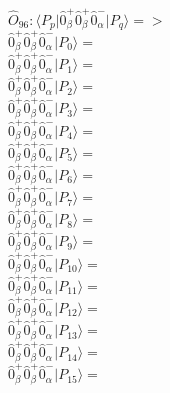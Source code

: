 \documentclass[14pt]{article}
\begin{document}
    $\hat{O}_{96}:  \langle{P_p}\vert \hat{0}_{\beta}^{+}\hat{0}_{\beta}^{+}\hat{0}_{\alpha}^{-} \vert{P_q}\rangle => $ \\ 
    $ \hat{0}_{\beta}^{+}\hat{0}_{\beta}^{+}\hat{0}_{\alpha}^{-} \vert{P_{0}}\rangle =  $ \\ 
    $ \hat{0}_{\beta}^{+}\hat{0}_{\beta}^{+}\hat{0}_{\alpha}^{-} \vert{P_{1}}\rangle =  $ \\ 
    $ \hat{0}_{\beta}^{+}\hat{0}_{\beta}^{+}\hat{0}_{\alpha}^{-} \vert{P_{2}}\rangle =  $ \\ 
    $ \hat{0}_{\beta}^{+}\hat{0}_{\beta}^{+}\hat{0}_{\alpha}^{-} \vert{P_{3}}\rangle =  $ \\ 
    $ \hat{0}_{\beta}^{+}\hat{0}_{\beta}^{+}\hat{0}_{\alpha}^{-} \vert{P_{4}}\rangle =  $ \\ 
    $ \hat{0}_{\beta}^{+}\hat{0}_{\beta}^{+}\hat{0}_{\alpha}^{-} \vert{P_{5}}\rangle =  $ \\ 
    $ \hat{0}_{\beta}^{+}\hat{0}_{\beta}^{+}\hat{0}_{\alpha}^{-} \vert{P_{6}}\rangle =  $ \\ 
    $ \hat{0}_{\beta}^{+}\hat{0}_{\beta}^{+}\hat{0}_{\alpha}^{-} \vert{P_{7}}\rangle =  $ \\ 
    $ \hat{0}_{\beta}^{+}\hat{0}_{\beta}^{+}\hat{0}_{\alpha}^{-} \vert{P_{8}}\rangle =  $ \\ 
    $ \hat{0}_{\beta}^{+}\hat{0}_{\beta}^{+}\hat{0}_{\alpha}^{-} \vert{P_{9}}\rangle =  $ \\ 
    $ \hat{0}_{\beta}^{+}\hat{0}_{\beta}^{+}\hat{0}_{\alpha}^{-} \vert{P_{10}}\rangle =  $ \\ 
    $ \hat{0}_{\beta}^{+}\hat{0}_{\beta}^{+}\hat{0}_{\alpha}^{-} \vert{P_{11}}\rangle =  $ \\ 
    $ \hat{0}_{\beta}^{+}\hat{0}_{\beta}^{+}\hat{0}_{\alpha}^{-} \vert{P_{12}}\rangle =  $ \\ 
    $ \hat{0}_{\beta}^{+}\hat{0}_{\beta}^{+}\hat{0}_{\alpha}^{-} \vert{P_{13}}\rangle =  $ \\ 
    $ \hat{0}_{\beta}^{+}\hat{0}_{\beta}^{+}\hat{0}_{\alpha}^{-} \vert{P_{14}}\rangle =  $ \\ 
    $ \hat{0}_{\beta}^{+}\hat{0}_{\beta}^{+}\hat{0}_{\alpha}^{-} \vert{P_{15}}\rangle =  $ \\ 
    
\end{document}
